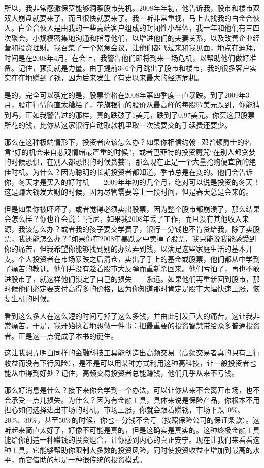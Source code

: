 所以，我非常感激保罗能够洞察股市先机。2008年年初，他告诉我，股市和楼市双双大崩盘就要来了，而且很快就要来了。我一听非常重视，马上去找我的白金合伙人。白金合伙人是由我的一些高端客户组成的封闭性小群体，我一年和他们有三四次聚会，小规模密集地沟通和指导他们，以增进他们的夫妻关系，以及改善企业经营和投资理财。我召集了一个紧急会议，让他们都飞过来和我见面，地点在迪拜，时间是在2008年4月。在会上，我警告他们即将到来一场危机，以帮助他们做好准备。记住，预测就是力量。由于提前3\textasciitilde{}6个月跳出了股市和楼市，我的很多客户实实在在地赚到了钱，因为后来发生了有史以来最大的经济危机。

是的，完全可以确定的是，股票价格在2008年第四季度一直暴跌。到了2009年3月，股市行情简直太糟糕了，花旗银行的股价从最高峰的每股57美元跌到，你能猜到吗，正如我警告过的那样，真的跌破了1美元，跌到了0.97美元。你买这只股票所花的钱，比你从这家银行自动取款机里取一次钱要交的手续费还要少。

那么在这种极端情形下，投资者应该怎么办？如果你相信约翰·邓普顿爵士的名言“好的机会来自悲观情绪最严重的时候”，或者巴菲特的投资魔咒“在别人都贪婪的时候恐惧，在别人都恐惧的时候贪婪”，那么现在正是一个大量抢购便宜货的绝佳时机。为什么？因为聪明的长期投资者都知道，季节总是在变的。他们会告诉你，冬天才是买入的好时机——2009年年初的几个月，绝对可以说是投资的冬天！这是赚大钱发大财的时候，因为尽管需要等上一段时间，但是春天总是会来的。

但是如果你被吓坏了，或者觉得必须卖出股票，因为整个股市都崩溃了，那么结果会怎么样？你也许会说：“托尼，如果我2008年丢了工作，而且没有其他收入来源，我该怎么办？或者我的孩子要交学费了，银行一分钱也不肯贷给我，除了卖股票，我还能怎么办？”如果你在2008年暴跌之中卖掉了股票，我只能说我能感受到你的痛苦，但我希望你能够找到别的办法弄到钱，以满足这些家庭生活的基本开支。个人投资者在市场暴跌之后清仓，卖出了手上的基金或股票，他们都从中学到了痛苦的教训。他们并没有趁着股市大反弹而重新杀回来。他们亏怕了，再也不敢进股市了，就这样他们锁定了自己的损失——永远。如果他们再重新回到股市，那时候他们必定要支付高得多的价格，因为你知道那时肯定是股市大幅快速上涨，恢复生机的时候。

看到这么多人在这么短的时间亏掉了这么多钱，并由此引发巨大的痛苦，这让我非常痛苦。于是，我开始执着地想做一件事：把最重要的投资智慧带给众多普通投资者。正是这一点促成了本书的诞生。

这让我想弄明白同样的金融科技工具能创造出高频交易（高频交易者真的只有上行收益而没有下行风险），是不是可以用某种方式利用这种高科技，让一般投资者也能从中得到好处？记住，高频交易投资者总能赚钱，他们几乎从来不亏钱。

那么好消息是什么？接下来你会学到一个办法，可以让你从来不会离开市场，也不会承受一点儿损失。为什么？因为有金融工具，具体来说是保险产品，你根本不用担心如何选择进出市场的时机。市场上涨，你就会跟着赚钱，市场下跌10\%、20\%、30\%，甚至50\%的时候，你也一分钱不会亏（按照保险公司的保证条款）。这听起来简直太好了，好像不可能是真的，但是这确实是真实的。这种终极金融工具能给你创造一种赚钱的投资组合，让你感到内心的真正安宁。现在让我们来看看这种工具，它能够帮助你限制大多数的投资风险，同时使投资收益率增加到最高的水平，而它借助的却是一种很传统的投资模式。

